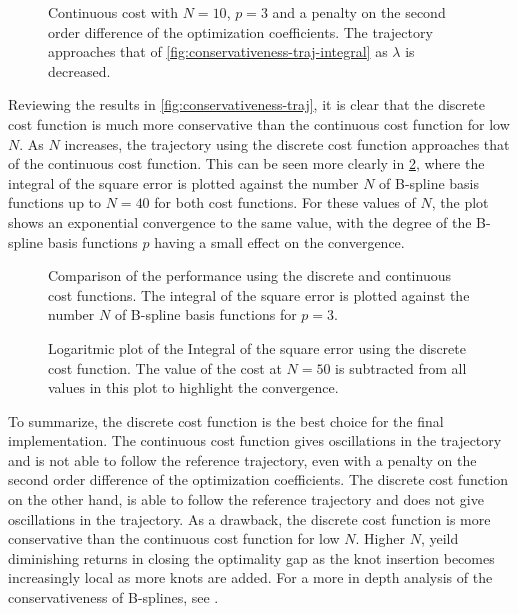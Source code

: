 \begin{figure}
    \centering
    
    \caption{Continuous cost with $N=10$, $p=3$ and a penalty on the second order difference of the optimization coefficients. The trajectory approaches that of \cref{fig:conservativeness-traj-integral} as $\lambda$ is decreased.}\label{fig:conservativeness-oscillation-damping}
\end{figure}


Reviewing the results in \cref{fig:conservativeness-traj}, it is clear that the discrete cost function is much more conservative than the continuous cost function for low $N$. As $N$ increases, the trajectory using the discrete cost function approaches that of the continuous cost function. This can be seen more clearly in \cref{fig:conservativeness}, where the integral of the square error is plotted against the number $N$ of B-spline basis functions up to $N=40$ for both cost functions. For these values of $N$, the plot shows an exponential convergence to the same value, with the degree of the B-spline basis functions $p$ having a small effect on the convergence.

\begin{figure}
    \centering
    
    \caption{Comparison of the performance using the discrete and continuous cost functions. The integral of the square error is plotted against the number $N$ of B-spline basis functions for $p=3$.}
    \label{fig:conservativeness}
\end{figure}


\begin{figure}
    \centering
    
    \caption{Logaritmic plot of the Integral of the square error using the discrete cost function. The value of the cost at $N=50$ is subtracted from all values in this plot to highlight the convergence.}
    \label{fig:conservativeness-coeffs}
\end{figure}

\FloatBarrier
To summarize, the discrete cost function is the best choice for the final implementation. The continuous cost function gives oscillations in the trajectory and is not able to follow the reference trajectory, even with a penalty on the second order difference of the optimization coefficients. The discrete cost function on the other hand, is able to follow the reference trajectory and does not give oscillations in the trajectory. As a drawback, the discrete cost function is more conservative than the continuous cost function for low $N$. Higher $N$, yeild diminishing returns in closing the optimality gap as the knot insertion becomes increasingly local as more knots are added.
For a more in depth analysis of the conservativeness of B-splines, see \citet{Grimstad2016}.


